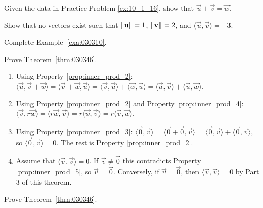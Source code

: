 \documentclass{ximera}
\begin{document}
\begin{problem}\label{prob:inner_prod_17}
Given the data in Practice Problem \ref{ex:10_1_16}, show that $\vec{u} + \vec{v} = \vec{w}$.
\end{problem}

\begin{problem}\label{prob:inner_prod_18}
Show that no vectors exist such that $\left\lVert\mathbf{u}\right\rVert = 1$, $\left\lVert\mathbf{v}\right\rVert = 2$, and $\langle\vec{u}, \vec{v}\rangle = -3$.
\end{problem}

\begin{problem} \label{ex:10_1_19}
Complete Example~\ref{exa:030310}.
\end{problem}

\begin{problem} \label{ex:10_1_20}
Prove Theorem~\ref{thm:030346}.

\begin{hint}
\begin{enumerate}
\item Using Property \ref{prop:inner_prod_2}:
$ \langle \vec{u}, \vec{v} + \vec{w} \rangle =
\langle \vec{v} + \vec{w}, \vec{u} \rangle =
\langle \vec{v}, \vec{u} \rangle + \langle \vec{w}, \vec{u} \rangle =
\langle \vec{u}, \vec{v} \rangle + \langle \vec{u}, \vec{w} \rangle$.

\item Using Property \ref{prop:inner_prod_2} and Property \ref{prop:inner_prod_4}:
$\langle \vec{v}, r\vec{w} \rangle =
\langle r\vec{w}, \vec{v} \rangle =
r \langle \vec{w}, \vec{v} \rangle =
r \langle \vec{v}, \vec{w} \rangle$.

\item Using Property \ref{prop:inner_prod_3}:
$\langle \vec{0}, \vec{v} \rangle =
\langle \vec{0} + \vec{0}, \vec{v} \rangle =
\langle \vec{0}, \vec{v} \rangle + \langle \vec{0}, \vec{v} \rangle
$, so $ \langle \vec{0}, \vec{v} \rangle = 0$. The rest is Property \ref{prop:inner_prod_2}.

\item Assume that $\langle \vec{v}, \vec{v} \rangle = 0$. If $\vec{v} \neq \vec{0}$ this contradicts Property \ref{prop:inner_prod_5}, so $\vec{v} = \vec{0}$. Conversely, if $\vec{v} = \vec{0}$, then $\langle \vec{v}, \vec{v} \rangle = 0$ by Part 3 of this theorem.
\end{enumerate}
\end{hint}
\end{problem}

\begin{problem} \label{ex:10_1_21}
Prove Theorem~\ref{thm:030346}.
\end{problem}
\end{document}
